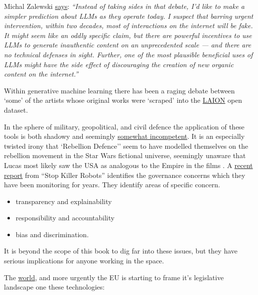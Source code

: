 Michal Zalewski \href{https://lcamtuf.substack.com/p/llms-a-bleak-future-ahead}{says}: \textit{``Instead of taking sides in that debate, I’d like to make a simpler prediction about LLMs as they operate today. I suspect that barring urgent intervention, within two decades, most of interactions on the internet will be fake. It might seem like an oddly specific claim, but there are powerful incentives to use LLMs to generate inauthentic content on an unprecedented scale — and there are no technical defenses in sight. Further, one of the most plausible beneficial uses of LLMs might have the side effect of discouraging the creation of new organic content on the internet.''}

Within generative machine learning there has been a raging debate between `some' of the artists whose original works were `scraped' into the \href{https://laion.ai/}{LAION} open dataset. \par
In the sphere of military, geopolitical, and civil defence the application of these tools is both shadowy and seemingly \href{https://www.vox.com/recode/23507236/inside-disruption-rebellion-defense-washington-connected-military-tech-startup}{somewhat incompetent}. It is an especially twisted irony that `Rebellion Defence'' seem to have modelled themselves on the rebellion movement in the Star Wars fictional universe, seemingly unaware that Lucas most likely saw the USA as analogous to the Empire in the films \cite{immerwahr202221}. A \href{https://www.stopkillerrobots.org/wp-content/uploads/2022/10/ADR-Artificial-intelligence-and-automated-decisions-Single-View.pdf}{recent report} from ``Stop Killer Robots'' identifies the governance concerns which they have been monitoring for years. They identify areas of specific concern.
\begin{itemize}
\item transparency and explainability \item responsibility and  accountability
\item bias and discrimination.
\end{itemize}
It is beyond the scope of this book to dig far into these issues, but they have serious implications for anyone working in the space. \par 
The \href{https://www.holisticai.com/papers/the-state-of-ai-regulations-in-2023}{world}, and more urgently the EU is starting to frame it's legislative landscape one these technologies:
